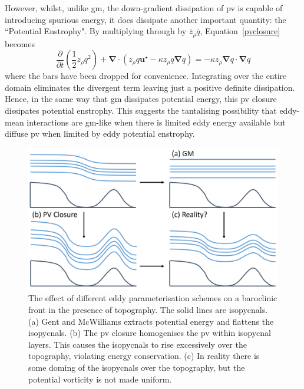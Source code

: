 \documentclass[12pt,a4paper]{report}
\newcommand*\mean[1]{\overline{#1}}
\newcommand*\equref[1]{Equation~\eqref{#1}}
\newcommand*{\half}{\frac{1}{2}}
\begin{document}
                However, whilst, unlike \gls{gm}, the down-gradient
                dissipation of \gls{pv} is capable of introducing spurious energy, it does
                dissipate another important quantity: 
                the ``Potential Enstrophy". By multiplying through 
                by $\mean{z}_{\rho} \mean{q}$, \equref{pvclosure} becomes 
                \begin{equation}
                \frac{\partial  }{\partial t}\left(\half z_{\rho}q^{2}\right) + \boldsymbol{\nabla}\cdot\left(z_{\rho}q\boldsymbol{u}^\star-\kappa z_{\rho}q\boldsymbol{\nabla} q
                \right)=-\kappa z_\rho \boldsymbol{\nabla}q\cdot\boldsymbol{\nabla}q
                \end{equation}
                where the bars have been dropped for convenience.
                Integrating over the entire domain eliminates the divergent term
                leaving just a positive definite dissipation.
                Hence, in the same way that \gls{gm} dissipates potential energy, this
                \gls{pv} closure dissipates potential enstrophy. This suggests the tantalising
                possibility that eddy-mean interactions are \gls{gm}-like when
                there is limited eddy energy available but diffuse \gls{pv} when
                limited by eddy potential enstrophy.
                
                \begin{figure}
                	\centering
                	\includegraphics[width=0.8\linewidth]{am00modified}
                	\caption[Cold-doming]{The effect of different
                		eddy parameterisation schemes on a baroclinic front in
                		the presence of topography. 
                		The solid lines are isopycnals. (a) 
                		Gent and McWilliams extracts potential energy and
                		flattens the isopycnals. 
                		(b) The \gls{pv} closure homogenises
                		the \gls{pv} within isopycnal layers. This causes the
                		isopycnals to rise excessively over the topography, violating energy
                		conservation. (c) In reality there is some doming of the isopycnals
                		over the topography, but the potential vorticity is not made uniform.
                		}
                	\label{fig:Colddoming}
                \end{figure}
                
\end{document}
